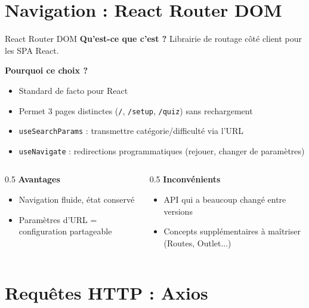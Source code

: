 \documentclass[aspectratio=169]{beamer}
\begin{document}
\section{Navigation : React Router DOM}

\begin{frame}{React Router DOM}
  \textbf{Qu'est-ce que c'est ?} Librairie de routage côté client pour les SPA React.

  \vspace{0.3cm}
  \textbf{Pourquoi ce choix ?}
  \begin{itemize}
    \item Standard de facto pour React
    \item Permet 3 pages distinctes (\texttt{/}, \texttt{/setup}, \texttt{/quiz}) sans rechargement
    \item \texttt{useSearchParams} : transmettre catégorie/difficulté via l'URL
    \item \texttt{useNavigate} : redirections programmatiques (rejouer, changer de paramètres)
  \end{itemize}

  \vspace{0.3cm}
  \begin{columns}
    \begin{column}{0.5\textwidth}
      \textbf{Avantages}
      \begin{itemize}
        \item Navigation fluide, état conservé
        \item Paramètres d'URL = configuration partageable
      \end{itemize}
    \end{column}
    \begin{column}{0.5\textwidth}
      \textbf{Inconvénients}
      \begin{itemize}
        \item API qui a beaucoup changé entre versions
        \item Concepts supplémentaires à maîtriser (Routes, Outlet...)
      \end{itemize}
    \end{column}
  \end{columns}
\end{frame}

\section{Requêtes HTTP : Axios}
\end{document}
